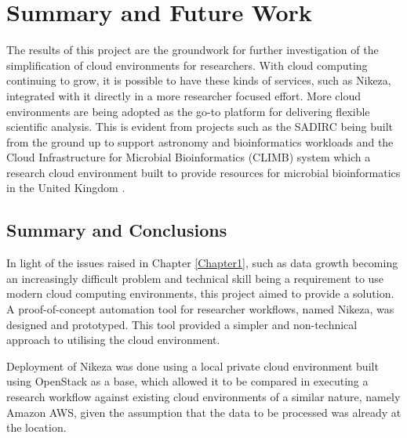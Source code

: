 
\chapter{Summary and Future Work} %

\label{Chapter5} %

The results of this project are the groundwork for further investigation of the simplification of cloud environments for researchers. With cloud computing continuing to grow, it is possible to have these kinds of services, such as Nikeza, integrated with it directly in a more researcher focused effort. More cloud environments are being adopted as the go-to platform for delivering flexible scientific analysis. This is evident from projects such as the SADIRC being built from the ground up to support astronomy and bioinformatics workloads and the Cloud Infrastructure for Microbial Bioinformatics (CLIMB) system which a research cloud environment built to provide resources for microbial bioinformatics in the United Kingdom \parencite{connor2016climb}.

\section{Summary and Conclusions}

In light of the issues raised in Chapter \ref{Chapter1}, such as data growth becoming an increasingly difficult problem and technical skill being a requirement to use modern cloud computing environments, this project aimed to provide a solution. A proof-of-concept automation tool for researcher workflows, named Nikeza, was designed and prototyped. This tool provided a simpler and non-technical approach to utilising the cloud environment.

Deployment of Nikeza was done using a local private cloud environment built using OpenStack as a base, which allowed it to be compared in executing a research workflow against existing cloud environments of a similar nature, namely Amazon AWS, given the assumption that the data to be processed was already at the location. 

